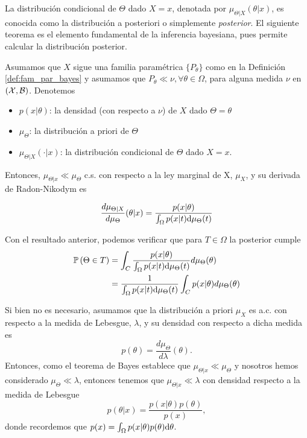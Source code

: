La distribución condicional de $\Theta$ dado $X=x$, denotada por $\mu_{\Theta|X}(\theta|x)$, es conocida como la distribución a posteriori o simplemente \textit{posterior}. El siguiente teorema es el elemento fundamental de la inferencia bayesiana, pues permite calcular la distribución posterior. 
\begin{theorem}[Bayes] Asumamos que $X$ sigue una familia paramétrica $\{P_\theta\}$ como en la Definición \ref{def:fam_par_bayes} y asumamos que $P_\theta\ll \nu ,\forall\theta\in\Omega$, para alguna medida $\nu$ en $({\mathcal X},{\mathcal B})$. Denotemos 
\begin{itemize}
	\item  $p(x|\theta)$: la densidad (con respecto a $\nu$) de $X$ dado $\Theta = \theta$
	\item  $\mu_\Theta$: la distribución a priori de $\Theta$
	\item $\mu_{\Theta|X}(\cdot|x)$: la distribución condicional de $\Theta$ dado $X=x$.
\end{itemize} 

Entonces, $\mu_{\Theta|x} \ll \mu_\Theta$ c.s. con respecto a la ley marginal de X, $\mu_X$, y su derivada de Radon-Nikodym es

\begin{equation}
	\frac{d\mu_{\Theta|X}}{d\mu_\Theta} (\theta|x) = \frac{p(x|\theta)}{\int_\Omega p(x|t) {\text{d}}\mu_\Theta(t)}
\end{equation}	
\end{theorem}
Con el resultado anterior, podemos verificar que para $T\in\Omega$ la posterior cumple 
\begin{align}
	\mathbb{P} \left(\Theta\in T\right) &= \int_C \frac{p(x|\theta)}{\int_\Omega p(x|t) {\text{d}}\mu_\Theta(t)} d\mu_\Theta(\theta)\\
	&= \frac{1}{\int_\Omega p(x|t) {\text{d}}\mu_\Theta(t)}\int_C p(x|\theta) d\mu_\Theta(\theta)
\end{align}


\begin{remark}
Si bien no es necesario, asumamos que la distribución a priori $\mu_X$ es a.c. con respecto a la medida de Lebesgue, $\lambda$, y su densidad con respecto a dicha medida es
\begin{equation}
	p(\theta) = \frac{d\mu_\Theta}{d\lambda}(\theta).
\end{equation}
Entonces, como el teorema de Bayes establece que $\mu_{\Theta|x} \ll \mu_\Theta$ y nosotros hemos considerado $\mu_\Theta \ll  \lambda$, entonces tenemos que $\mu_{\Theta|x} \ll \lambda$ con densidad respecto a la medida de Lebesgue
\begin{equation}
 	p(\theta|x) = \frac{p(x|\theta)p(\theta)}{p(x)},
 \end{equation} 
	donde recordemos que $p(x) = \int_\Omega p(x|\theta)p(\theta){\text{d}}\theta$.
\end{remark}

